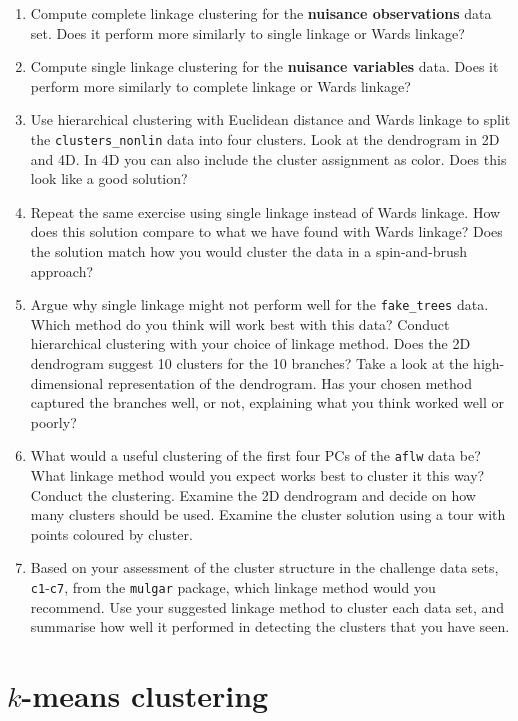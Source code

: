 \documentclass[
  letterpaper,
]{krantz}
\providecommand{\tightlist}{%
  \setlength{\itemsep}{0pt}\setlength{\parskip}{0pt}}\usepackage{longtable,booktabs,array}
\begin{document}
\begin{enumerate}
\def\labelenumi{\arabic{enumi}.}
\tightlist
\item
  Compute complete linkage clustering for the \textbf{nuisance
  observations} data set. Does it perform more similarly to single
  linkage or Wards linkage?
\item
  Compute single linkage clustering for the \textbf{nuisance variables}
  data. Does it perform more similarly to complete linkage or Wards
  linkage?
\item
  Use hierarchical clustering with Euclidean distance and Wards linkage
  to split the \texttt{clusters\_nonlin} data into four clusters. Look
  at the dendrogram in 2D and 4D. In 4D you can also include the cluster
  assignment as color. Does this look like a good solution?
\item
  Repeat the same exercise using single linkage instead of Wards
  linkage. How does this solution compare to what we have found with
  Wards linkage? Does the solution match how you would cluster the data
  in a spin-and-brush approach?
\item
  Argue why single linkage might not perform well for the
  \texttt{fake\_trees} data. Which method do you think will work best
  with this data? Conduct hierarchical clustering with your choice of
  linkage method. Does the 2D dendrogram suggest 10 clusters for the 10
  branches? Take a look at the high-dimensional representation of the
  dendrogram. Has your chosen method captured the branches well, or not,
  explaining what you think worked well or poorly?
\item
  What would a useful clustering of the first four PCs of the
  \texttt{aflw} data be? What linkage method would you expect works best
  to cluster it this way? Conduct the clustering. Examine the 2D
  dendrogram and decide on how many clusters should be used. Examine the
  cluster solution using a tour with points coloured by cluster.\\
\item
  Based on your assessment of the cluster structure in the challenge
  data sets, \texttt{c1}-\texttt{c7}, from the \texttt{mulgar} package,
  which linkage method would you recommend. Use your suggested linkage
  method to cluster each data set, and summarise how well it performed
  in detecting the clusters that you have seen.
\end{enumerate}

\chapter{\texorpdfstring{\(k\)-means
clustering}{k-means clustering}}\label{sec-kmeans}
\end{document}
